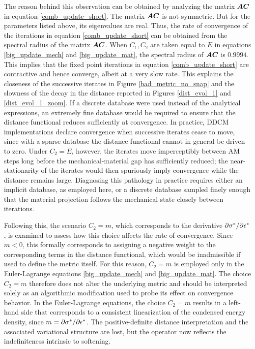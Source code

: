 \documentclass[10pt,review]{cas-sc}
\begin{document}
The reason behind this observation can be obtained by analyzing the matrix $\mbox{\boldmath $A$} \mbox{\boldmath $C$}$ in equation \eqref{comb_update_short}. The matrix $\mbox{\boldmath $A$} \mbox{\boldmath $C$}$ is not symmetric. But for the parameters listed above, its eigenvalues are real. Thus, the rate of convergence of the iterations in equation \eqref{comb_update_short} can be obtained from the spectral radius of the matrix $\mbox{\boldmath $A$}  \mbox{\boldmath $C$}$. When $C_1,C_2$ are taken equal to $E$ in equations \eqref{big_update_mech} and \eqref{big_update_mat}, the spectral radius of $\mbox{\boldmath $A$} \mbox{\boldmath $C$}$ is $0.9994$. This implies that the fixed point iterations in equation \eqref{comb_update_short} are contractive and hence converge, albeit at a very slow rate. This explains the closeness of the successive iterates in Figure \ref{bad_metric_no_snap} and the slowness of the decay in the distance reported in Figures \ref{dist_evol_1} and \ref{dist_evol_1_zoom}. If a discrete database were used instead of the analytical expressions, an extremely fine database would be required to ensure that the distance functional reduces sufficiently at convergence. In practice, DDCM implementations declare convergence when successive iterates cease to move, since with a sparse database the distance functional cannot in general be driven to zero. Under $C_2 = E$, however, the iterates move imperceptibly between AM steps long before the mechanical-material gap has sufficiently reduced; the near-stationarity of the iterates would then spuriously imply convergence while the distance remains large. Diagnosing this pathology in practice requires either an implicit database, as employed here, or a discrete database sampled finely enough that the material projection follows the mechanical state closely between iterations.

Following this, the scenario $C_2 = m$, which corresponds to the derivative $\partial {\sigma}^*/ \partial {\epsilon} ^*$, is examined to assess how this choice affects the rate of convergence. Since $m < 0$, this formally corresponds to assigning a negative weight to the corresponding terms in the distance functional, which would be inadmissible if used to define the metric itself. For this reason, $C_2 = m$ is employed only in the Euler-Lagrange equations \eqref{big_update_mech} and \eqref{big_update_mat}. The choice $C_2 = m$ therefore does not alter the underlying metric and should be interpreted solely as an algorithmic modification used to probe its effect on convergence behavior. In the Euler-Lagrange equations, the choice $C_2=m$ results in a left-hand side that corresponds to a consistent linearization of the condensed energy density, since $m=\partial {\sigma}^*/ \partial {\epsilon} ^*$. The positive-definite distance interpretation and the associated variational structure are lost, but the operator now reflects the indefiniteness intrinsic to softening.
\end{document}
